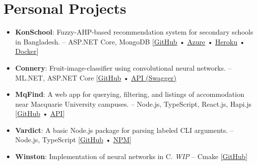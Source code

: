 \documentclass[letter-paper,10pt]{article}
\newcommand{\resumeItem}[2]{
  \item\small{
    \textbf{#1}{: #2 \vspace{-2pt}}
  }
}
\newcommand{\resumeSubItem}[2]{\resumeItem{#1}{#2}\vspace{-3pt}}
\newcommand{\resumeSubHeadingListStart}{\begin{itemize}[leftmargin=*]}
\newcommand{\resumeSubHeadingListEnd}{\end{itemize}}
\begin{document}
\section{Personal Projects}
  \resumeSubHeadingListStart
    \resumeSubItem{KonSchool}
      {Fuzzy-AHP-based recommendation system for secondary schools in Bangladesh. -- ASP.NET Core, MongoDB [\href{https://github.com/maacpiash/KonSchool}{\underline{GitHub}} • \href{https://konschool.azurewebsites.net/}{\underline{Azure}} • \href{https://konschool.herokuapp.com}{\underline{Heroku}} • \href{https://hub.docker.com/r/maacpiash/konschool}{\underline{Docker}}]}
    \resumeSubItem{Connery}
      {Fruit-image-classifier using convolutional neural networks. -- ML.NET, ASP.NET Core [\href{https://github.com/maacpiash/Connery}{\underline{GitHub}} • \href{https://connery-api.herokuapp.com}{\underline{API (Swagger)}}}
    \resumeSubItem{MqFind}
      {A web app for querying, filtering, and listings of accommodation near Macquarie University campuses. -- Node.js, TypeScript, React.js, Hapi.js [\href{https://github.com/maacpiash/MqFind}{\underline{GitHub}} • \href{https://mqfind-api.herokuapp.com}{\underline{API}}]}
    \resumeSubItem{Vardict}
      {A basic Node.js package for parsing labeled CLI arguments. -- Node.js, TypeScript [\href{https://github.com/maacpiash/vardict}{\underline{GitHub}} • \href{https://www.npmjs.com/package/vardict/}{\underline{NPM}}]}
    \resumeSubItem{Winston}
      {Implementation of neural networks in C. \textit{WIP} -- Cmake [\href{https://github.com/maacpiash/Winston}{\underline{GitHub}}]}
  \resumeSubHeadingListEnd
\end{document}
